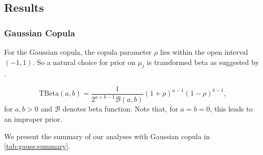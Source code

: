 \documentclass{amsart}
\begin{document}
\subsection{Results}

\subsubsection{Gaussian Copula} For the Gaussian copula, the copula parameter $\rho$ lies within the open interval $(-1,1)$. So a natural choice for prior on $\mu_j$ is transformed beta as suggested by \citet{gokhale_prior_cor}. 

\begin{equation}
	\text{TBeta}(a, b) = \frac{1}{2^{a+b-1}\mathcal{B}(a,b)}(1+\rho)^{a-1}(1-\rho)^{b-1},
\end{equation}
for $a,b>0$ and $\mathcal{B}$ denotes beta function. Note that, for $a=b=0$, this leads to an improper prior. 

We present the summary of our analyses with Gaussian copula in \cref{tab:gauss:summary}. 
\end{document}
